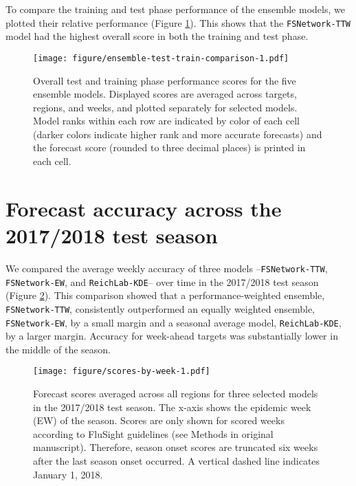 \documentclass{article}\usepackage[]{graphicx}\usepackage[]{color}
\begin{document}
To compare the training and test phase performance of the ensemble models, we plotted their relative performance (Figure \ref{fig:ensemble-test-train}). This shows that the {\tt FSNetwork-TTW} model had the highest overall score in both the training and test phase.

\begin{figure}[htbp]
\begin{center}
\texttt{[image: figure/ensemble-test-train-comparison-1.pdf]}
\caption{Overall test and training phase performance scores for the five ensemble models. Displayed scores are averaged across targets, regions, and weeks, and plotted separately for selected models. Model ranks within each row are indicated by color of each cell (darker colors indicate higher rank and more accurate forecasts) and the forecast score (rounded to three decimal places) is printed in each cell.}
\label{fig:ensemble-test-train}
\end{center}
\end{figure}


\section{Forecast accuracy across the 2017/2018 test season}

We compared the average weekly accuracy of three models --{\tt FSNetwork-TTW}, {\tt FSNetwork-EW}, and {\tt ReichLab-KDE}-- over time in the 2017/2018 test season (Figure \ref{fig:weekly-accuracy}). This comparison showed that a performance-weighted ensemble, {\tt FSNetwork-TTW}, consistently outperformed an equally weighted ensemble, {\tt FSNetwork-EW}, by a small margin and a seasonal average model, {\tt ReichLab-KDE}, by a larger margin. Accuracy for week-ahead targets was substantially lower in the middle of the season.

\begin{figure}[htbp]
\begin{center}
\texttt{[image: figure/scores-by-week-1.pdf]} 
\caption{Forecast scores averaged across all regions for three selected models in the 2017/2018 test season. The x-axis shows the epidemic week (EW) of the season. Scores are only shown for scored weeks according to FluSight guidelines (see Methods in original manuscript). Therefore, season onset scores are truncated six weeks after the last season onset occurred. A vertical dashed line indicates January 1, 2018.}
\label{fig:weekly-accuracy}
\end{center}
\end{figure}
\end{document}
